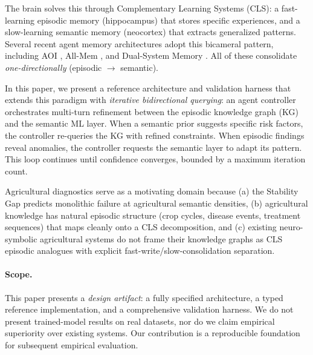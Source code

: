 \documentclass{article}
\begin{document}
The brain solves this through Complementary Learning Systems (CLS): a fast-learning
episodic memory (hippocampus) that stores specific experiences, and a slow-learning
semantic memory (neocortex) that extracts generalized patterns. Several recent agent
memory architectures adopt this bicameral pattern, including AOI \citep{aoi2025},
All-Mem \citep{allmem2026}, and Dual-System Memory \citep{dualsystem2026}. All of
these consolidate \emph{one-directionally} (episodic $\rightarrow$ semantic).

In this paper, we present a reference architecture and validation harness that
extends this paradigm with \emph{iterative bidirectional querying}: an agent
controller orchestrates multi-turn refinement between the episodic knowledge graph
(KG) and the semantic ML layer. When a semantic prior suggests specific risk
factors, the controller re-queries the KG with refined constraints. When episodic
findings reveal anomalies, the controller requests the semantic layer to adapt its
pattern. This loop continues until confidence converges, bounded by a maximum
iteration count.

Agricultural diagnostics serve as a motivating domain because (a) the Stability Gap
predicts monolithic failure at agricultural semantic densities, (b) agricultural
knowledge has natural episodic structure (crop cycles, disease events, treatment
sequences) that maps cleanly onto a CLS decomposition, and (c) existing
neuro-symbolic agricultural systems \citep{openag2025, neurocausalfusionnet2025,
agrisensnet2026} do not frame their knowledge graphs as CLS episodic analogues with
explicit fast-write/slow-consolidation separation.

\paragraph{Scope.}
This paper presents a \emph{design artifact}: a fully specified architecture, a
typed reference implementation, and a comprehensive validation harness. We do not
present trained-model results on real datasets, nor do we claim empirical
superiority over existing systems. Our contribution is a reproducible foundation
for subsequent empirical evaluation.
\end{document}
